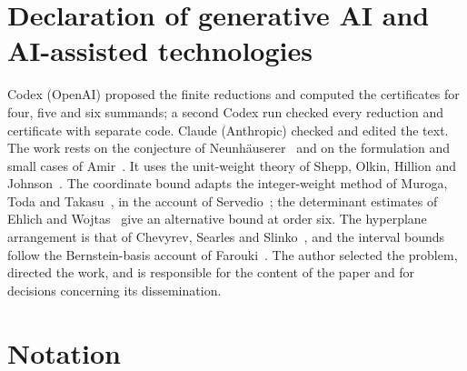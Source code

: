 \documentclass[11pt,a4paper]{article}
\numberwithin{equation}{section}
\theoremstyle{remark}
\begin{document}
\section*{Declaration of generative AI and AI-assisted technologies}
Codex (OpenAI) proposed the finite reductions and computed the certificates for four, five and six summands; a second Codex run checked every reduction and certificate with separate code. Claude (Anthropic) checked and edited the text. The work rests on the conjecture of Neunh\"auserer~\cite{Neun} and on the formulation and small cases of Amir~\cite{Amir}. It uses the unit-weight theory of Shepp, Olkin, Hillion and Johnson~\cite{SO,HJ}. The coordinate bound adapts the integer-weight method of Muroga, Toda and Takasu~\cite{MTT}, in the account of Servedio~\cite{Servedio}; the determinant estimates of Ehlich and Wojtas~\cite{Ehlich,Wojtas} give an alternative bound at order six. The hyperplane arrangement is that of Chevyrev, Searles and Slinko~\cite{CSS}, and the interval bounds follow the Bernstein-basis account of Farouki~\cite{Farouki}. The author selected the problem, directed the work, and is responsible for the content of the paper and for decisions concerning its dissemination.

\appendix
\section{Notation}\label{app:notation}
\end{document}
